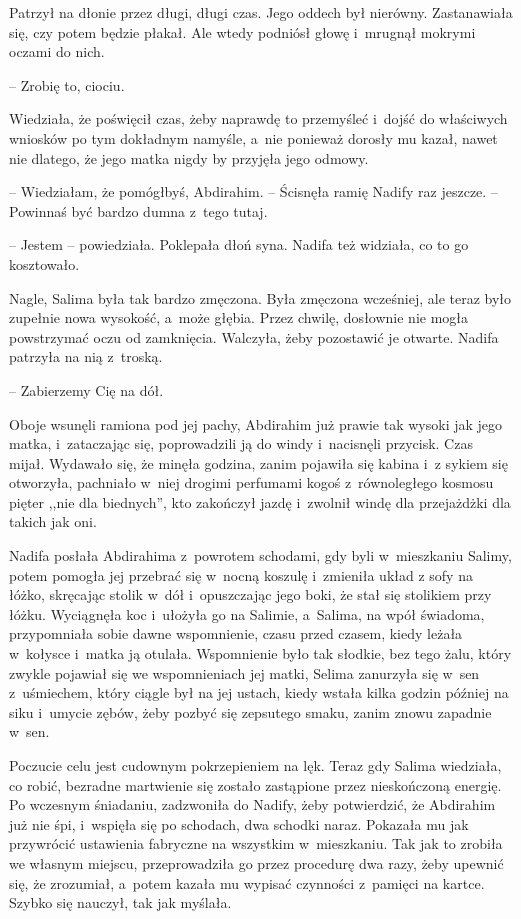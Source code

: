 \documentclass[oneside,polish,11pt,sfheadings]{mwbk}
\begin{document}
Patrzył na dłonie przez długi, długi czas. Jego oddech był nierówny.
Zastanawiała się, czy potem będzie płakał. Ale wtedy podniósł głowę i~mrugnął mokrymi oczami do nich. 

-- Zrobię to, ciociu.

Wiedziała, że poświęcił czas, żeby naprawdę to przemyśleć i~dojść do
właściwych wniosków po tym dokładnym namyśle, a~nie ponieważ dorosły mu
kazał, nawet nie dlatego, że jego matka nigdy by przyjęła jego odmowy.

-- Wiedziałam, że pomógłbyś, Abdirahim. -- Ścisnęła ramię Nadify raz
jeszcze. -- Powinnaś być bardzo dumna z~tego tutaj.

-- Jestem -- powiedziała. Poklepała dłoń syna. Nadifa też widziała, co to
go kosztowało.

Nagle, Salima była tak bardzo zmęczona. Była zmęczona wcześniej, ale
teraz było zupełnie nowa wysokość, a~może głębia. Przez chwilę,
dosłownie nie mogła powstrzymać oczu od zamknięcia. Walczyła, żeby
pozostawić je otwarte. Nadifa patrzyła na nią z~troską.

-- Zabierzemy Cię na dół.

Oboje wsunęli ramiona pod jej pachy, Abdirahim już prawie tak wysoki jak
jego matka, i~zataczając się, poprowadzili ją do windy i~nacisnęli
przycisk. Czas mijał. Wydawało się, że minęła godzina, zanim pojawiła
się kabina i~z sykiem się otworzyła, pachniało w~niej drogimi perfumami
kogoś z~równoległego kosmosu pięter ,,nie dla biednych'', kto zakończył
jazdę i~zwolnił windę dla przejażdżki dla takich jak oni.

Nadifa posłała Abdirahima z~powrotem schodami, gdy byli w~mieszkaniu
Salimy, potem pomogła jej przebrać się w~nocną koszulę i~zmieniła układ
z sofy na łóżko, skręcając stolik w~dół i~opuszczając jego boki, że stał
się stolikiem przy łóżku. Wyciągnęła koc i~ułożyła go na Salimie, a~Salima, na wpół świadoma, przypomniała sobie dawne wspomnienie, czasu
przed czasem, kiedy leżała w~kołysce i~matka ją otulała. Wspomnienie
było tak słodkie, bez tego żalu, który zwykle pojawiał się we
wspomnieniach jej matki, Selima zanurzyła się w~sen z~uśmiechem, który
ciągle był na jej ustach, kiedy wstała kilka godzin później na siku i~umycie zębów, żeby pozbyć się zepsutego smaku, zanim znowu zapadnie w~sen.

Poczucie celu jest cudownym pokrzepieniem na lęk. Teraz gdy Salima
wiedziała, co robić, bezradne martwienie się zostało zastąpione przez
nieskończoną energię. Po wczesnym śniadaniu, zadzwoniła do Nadify, żeby
potwierdzić, że Abdirahim już nie śpi, i~wspięła się po schodach, dwa
schodki naraz. Pokazała mu jak przywrócić ustawienia fabryczne na
wszystkim w~mieszkaniu. Tak jak to zrobiła we własnym miejscu,
przeprowadziła go przez procedurę dwa razy, żeby upewnić się, że
zrozumiał, a~potem kazała mu wypisać czynności z~pamięci na kartce.
Szybko się nauczył, tak jak myślała.
\end{document}

